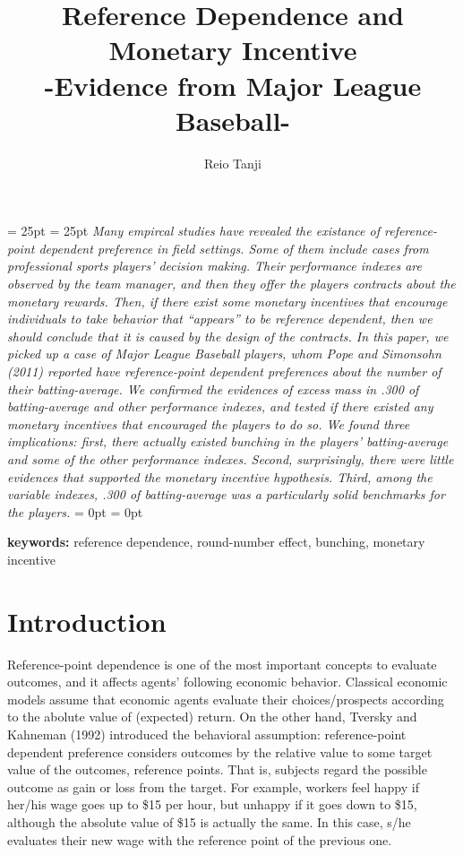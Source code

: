 \documentclass[dvipdfmx, 12pt]{article}
\begin{document}
\title{Reference Dependence and Monetary Incentive \\
-Evidence from Major League Baseball-}
\author{Reio Tanji}
\date{}
\maketitle

\leftskip = 25pt
\rightskip = 25pt
\small
\textit{
Many empircal studies have revealed the existance of reference-point dependent preference in field settings. Some of them include cases from professional sports players' decision making. Their performance indexes are observed by the team manager, and then they offer the players contracts about the monetary rewards. Then, if there exist some monetary incentives that encourage individuals to take behavior that ``appears'' to be reference dependent, then we should conclude that it is caused by the design of the contracts. In this paper, we picked up a case of Major League Baseball players, whom Pope and Simonsohn (2011) reported have reference-point dependent preferences about the number of their batting-average. We confirmed the evidences of excess mass in .300 of batting-average and other performance indexes, and tested if there existed any monetary incentives that encouraged the players to do so. We found three implications: first, there actually existed bunching in the players' batting-average and some of the other performance indexes. Second, surprisingly, there were little evidences that supported the monetary incentive hypothesis. Third, among the variable indexes, .300 of batting-average was a particularly solid benchmarks for the players.
  }
\leftskip = 0pt
\rightskip = 0pt
\vspace{1.5zw}

\noindent
\small
\textbf{keywords:} reference dependence, round-number effect, bunching, monetary incentive

\normalsize


\section{Introduction}

Reference-point dependence is one of the most important concepts to evaluate outcomes, and it affects agents' following economic behavior. Classical economic models assume that economic agents evaluate their choices/prospects according to the abolute value of (expected) return. On the other hand, Tversky and Kahneman (1992) introduced the behavioral assumption: reference-point dependent preference considers outcomes by the relative value to some target value of the outcomes, reference points. That is, subjects regard the possible outcome as gain or loss from the target. For example, workers feel happy if her/his wage goes up to \$15 per hour, but unhappy if it goes down to \$15, although the absolute value of \$15 is actually the same. In this case, s/he evaluates their new wage with the reference point of the previous one.
\end{document}
